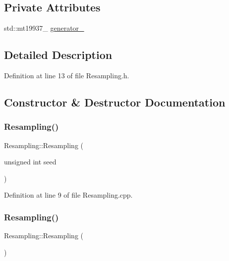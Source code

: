 \subsection*{Private Attributes}
\begin{DoxyCompactItemize}
\item 
std\+::mt19937\+\_ \mbox{\hyperlink{classbfl_1_1Resampling_abfffdeeb6fc82608a4ff2fdae3c707f0}{generator\+\_\+}}
\end{DoxyCompactItemize}


\subsection{Detailed Description}


Definition at line 13 of file Resampling.\+h.



\subsection{Constructor \& Destructor Documentation}
\mbox{\label{classbfl_1_1Resampling_a22472d13211e8384eb56e0a16cbef63c}} 
\subsubsection{\texorpdfstring{Resampling()}{Resampling()}\hspace{0.1cm}{\footnotesize\ttfamily [1/4]}}
{\footnotesize\ttfamily Resampling\+::\+Resampling (\begin{DoxyParamCaption}\item[{unsigned int}]{seed }\end{DoxyParamCaption})\hspace{0.3cm}{\ttfamily [noexcept]}}



Definition at line 9 of file Resampling.\+cpp.

\mbox{\label{classbfl_1_1Resampling_a817b9424651d6e54c5237feed607d530}} 
\subsubsection{\texorpdfstring{Resampling()}{Resampling()}\hspace{0.1cm}{\footnotesize\ttfamily [2/4]}}
{\footnotesize\ttfamily Resampling\+::\+Resampling (\begin{DoxyParamCaption}{ }\end{DoxyParamCaption})\hspace{0.3cm}{\ttfamily [noexcept]}}



